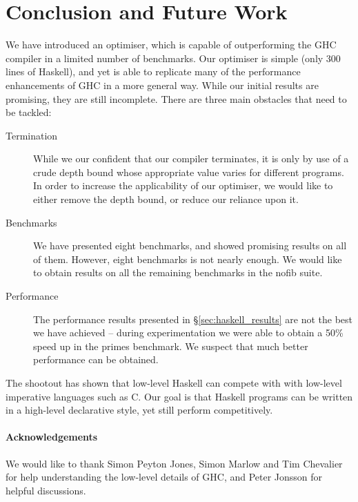 \documentclass{llncs}
\begin{document}
\section{Conclusion and Future Work}
\label{sec:conclusion}

We have introduced an optimiser, which is capable of outperforming the GHC compiler in a limited number of benchmarks. Our optimiser is simple (only 300 lines of Haskell), and yet is able to replicate many of the performance enhancements of GHC in a more general way. While our initial results are promising, they are still incomplete. There are three main obstacles that need to be tackled:

\begin{description}
\item[Termination] While we our confident that our compiler terminates, it is only by use of a crude depth bound whose appropriate value varies for different programs. In order to increase the applicability of our optimiser, we would like to either remove the depth bound, or reduce our reliance upon it.
\item[Benchmarks] We have presented eight benchmarks, and showed promising results on all of them. However, eight benchmarks is not nearly enough. We would like to obtain results on all the remaining benchmarks in the nofib suite.
\item[Performance] The performance results presented in \S\ref{sec:haskell_results} are not the best we have achieved -- during experimentation we were able to obtain a 50\% speed up in the primes benchmark. We suspect that much better performance can be obtained.
\end{description}

The shootout has shown that low-level Haskell can compete with with low-level imperative languages such as C. Our goal is that Haskell programs can be written in a high-level declarative style, yet still perform competitively.

\paragraph{Acknowledgements} We would like to thank Simon Peyton Jones, Simon Marlow and Tim Chevalier for help understanding the low-level details of GHC, and Peter Jonsson for helpful discussions.




\end{document}
